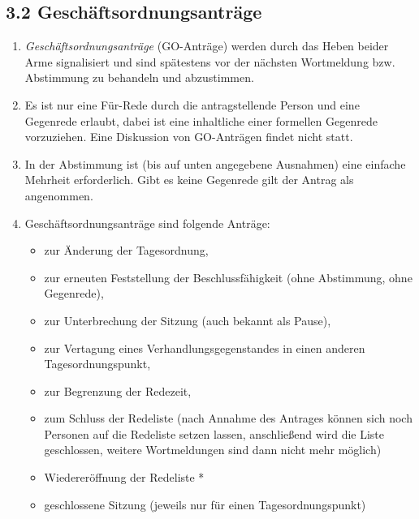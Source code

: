 \documentclass[12pt,oneside]{scrartcl}
\begin{document}
\subsection{3.2 Geschäftsordnungsanträge%
  \label{geschaftsordnungsantrage}%
}

\begin{enumerate}
\item \emph{Geschäftsordnungsanträge} (GO-Anträge) werden durch das Heben
beider Arme signalisiert und sind spätestens vor der nächsten Wortmeldung
bzw. Abstimmung zu behandeln und abzustimmen.

\item Es ist nur eine Für-Rede durch die antragstellende Person und eine Gegenrede
erlaubt, dabei ist eine inhaltliche einer formellen Gegenrede vorzuziehen.
Eine Diskussion von GO-Anträgen findet nicht statt.

\item In der Abstimmung ist (bis auf unten angegebene Ausnahmen) eine einfache
Mehrheit erforderlich.
Gibt es keine Gegenrede gilt der Antrag als angenommen.

\item Geschäftsordnungsanträge sind folgende Anträge:

\begin{itemize}
\item zur Änderung der Tagesordnung,

\item zur erneuten Feststellung der Beschlussfähigkeit
(ohne Abstimmung, ohne Gegenrede),

\item zur Unterbrechung der Sitzung (auch bekannt als \textquotedbl{}Pause\textquotedbl{}),

\item zur Vertagung eines Verhandlungsgegenstandes in einen anderen
Tagesordnungspunkt,

\item zur Begrenzung der Redezeit,

\item zum Schluss der Redeliste (nach Annahme des Antrages können sich noch
Personen auf die Redeliste setzen lassen, anschließend wird die Liste
geschlossen, weitere Wortmeldungen sind dann nicht mehr möglich)

\item Wiedereröffnung der Redeliste *

\item geschlossene Sitzung (jeweils nur für einen Tagesordnungspunkt)


\end{itemize}
\end{enumerate}
\end{document}
